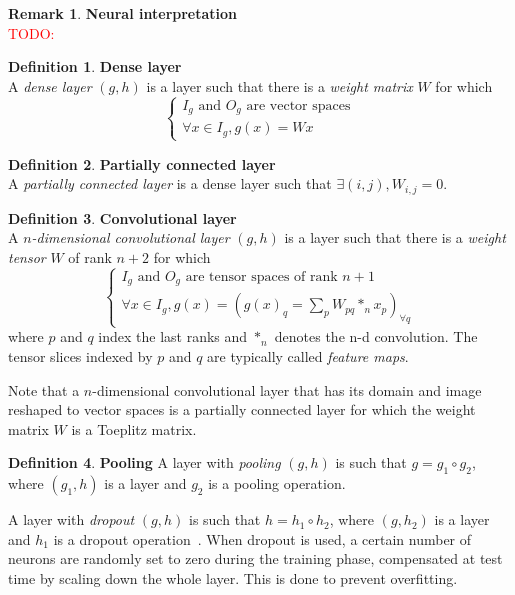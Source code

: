 \documentclass{article}
\theoremstyle{definition}
\newtheorem{definition}{Definition}[section]
\newtheorem{remark}{Remark}
\newcommand{\todo}[1]{\textcolor{red}{TODO: #1}}
\begin{document}
\begin{remark}\textbf{Neural interpretation}\\
\todo{}
\end{remark}

\begin{definition}\textbf{Dense layer}\\
A \textit{dense layer} $(g,h)$ is a layer such that there is a \textit{weight matrix} $W$ for which
$$
\left\{
\begin{array}{l}
  I_g \mbox{ and } O_g \mbox{ are vector spaces} \\
  \forall x \in I_g, g(x) = Wx
\end{array}
\right.
$$
\end{definition}

\begin{definition}\textbf{Partially connected layer}\\
A \textit{partially connected layer} is a dense layer such that $\exists (i,j), W_{i,j} = 0$.
\end{definition}

\begin{definition}\textbf{Convolutional layer}\\
A \textit{$n$-dimensional convolutional layer} $(g,h)$ is a layer such that there is a \textit{weight tensor} $W$ of rank $n+2$ for which
$$
\left\{
\begin{array}{l}
  I_g \mbox{ and } O_g \mbox{ are tensor spaces of rank }n+1 \\
  \forall x \in I_g, g(x) = (g(x)_q = \sum\limits_p{W_{pq} \ast_n x_p})_{\forall q}
\end{array}
\right.
$$
where $p$ and $q$ index the last ranks and $\ast_n$ denotes the n-d convolution. The tensor slices indexed by $p$ and $q$ are typically called \textit{feature maps}.
\end{definition}

Note that a $n$-dimensional convolutional layer that has its domain and image reshaped to vector spaces is a partially connected layer for which the weight matrix $W$ is a Toeplitz matrix.


\begin{definition}\textbf{Pooling}
A layer with \textit{pooling} $(g,h)$ is such that $g = g_1 \circ g_2$, where $(g_1,h)$ is a layer and $g_2$ is a pooling operation.
\end{definition}

A layer with \textit{dropout} $(g,h)$ is such that $h = h_1 \circ h_2$, where $(g,h_2)$ is a layer and $h_1$ is a dropout operation~\cite{srivastava2014dropout}. When dropout is used, a certain number of neurons are randomly set to zero during the training phase, compensated at test time by scaling down the whole layer. This is done to prevent overfitting.
\end{document}
